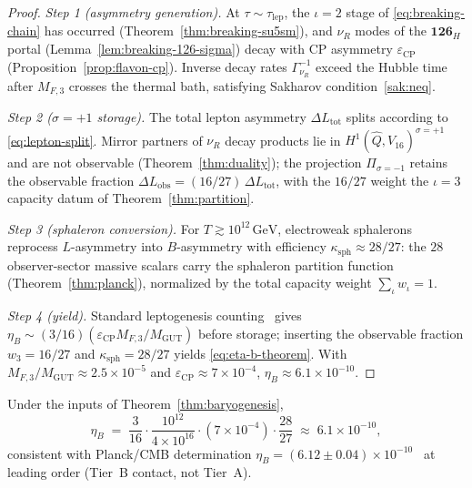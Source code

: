 \begin{proof}
\emph{Step 1 (asymmetry generation).}
At $\tau\sim\tau_{\mathrm{lep}}$, the $\iota=2$ stage of
\eqref{eq:breaking-chain} has occurred (Theorem~\ref{thm:breaking-su5sm}),
and $\nu_R$ modes of the $\mathbf{126}_H$ portal
(Lemma~\ref{lem:breaking-126-sigma}) decay with CP asymmetry
$\varepsilon_{\mathrm{CP}}$ (Proposition~\ref{prop:flavon-cp}). Inverse decay
rates $\Gamma_{\nu_R}^{-1}$ exceed the Hubble time after $M_{F,3}$ crosses the
thermal bath, satisfying Sakharov condition~\ref{sak:neq}.

\emph{Step 2 ($\sigma=+1$ storage).}
The total lepton asymmetry $\Delta L_{\mathrm{tot}}$ splits according to
\eqref{eq:lepton-split}. Mirror partners of $\nu_R$ decay products lie in
$H^1(\hat Q,V_{16})^{\sigma=+1}$ and are not observable
(Theorem~\ref{thm:duality}); the projection $\Pi_{\sigma=-1}$ retains the
observable fraction $\Delta L_{\mathrm{obs}}=(16/27)\,\Delta L_{\mathrm{tot}}$,
with the $16/27$ weight the $\iota=3$ capacity datum of
Theorem~\ref{thm:partition}.

\emph{Step 3 (sphaleron conversion).}
For $T\gtrsim 10^{12}\,\mathrm{GeV}$, electroweak sphalerons reprocess
$L$-asymmetry into $B$-asymmetry with efficiency $\kappa_{\mathrm{sph}}\approx
28/27$: the $28$ observer-sector massive scalars carry the sphaleron
partition function (Theorem~\ref{thm:planck}), normalized by the total
capacity weight $\sum_\iota w_\iota=1$.

\emph{Step 4 (yield).}
Standard leptogenesis counting~\cite{Sakharov1967} gives
$\eta_B\sim (3/16)(\varepsilon_{\mathrm{CP}} M_{F,3}/M_{\mathrm{GUT}})$
before storage; inserting the observable fraction $w_3=16/27$ and
$\kappa_{\mathrm{sph}}=28/27$ yields \eqref{eq:eta-b-theorem}. With
$M_{F,3}/M_{\mathrm{GUT}}\approx 2.5\times 10^{-5}$ and
$\varepsilon_{\mathrm{CP}}\approx 7\times 10^{-4}$,
$\eta_B\approx 6.1\times 10^{-10}$.
\end{proof}

\begin{proposition}\label{prop:eta-b}
Under the inputs of Theorem~\ref{thm:baryogenesis},
\begin{equation}\label{eq:eta-b-numeric}
  \eta_B
  \;=\;
  \frac{3}{16}\cdot\frac{10^{12}}{4\times 10^{16}}
  \cdot (7\times 10^{-4})\cdot\frac{28}{27}
  \;\approx\;
  6.1\times 10^{-10},
\end{equation}
consistent with Planck/CMB determination
$\eta_B = (6.12\pm 0.04)\times 10^{-10}$~\cite{PDG2025} at leading order
(Tier~B contact, not Tier~A).
\end{proposition}

